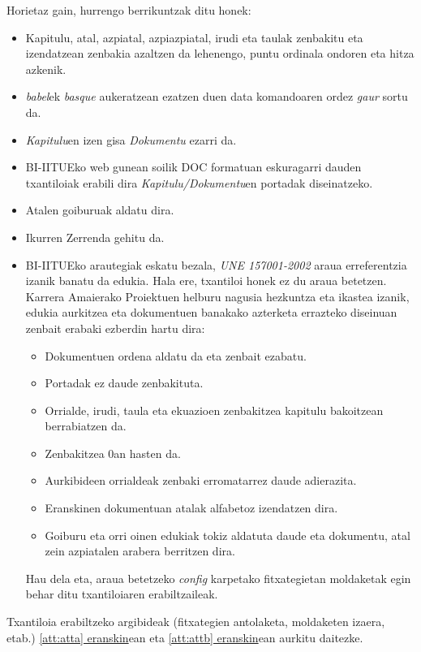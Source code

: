 Horietaz gain, hurrengo berrikuntzak ditu honek:

\begin{itemize}
\item{Kapitulu, atal, azpiatal, azpiazpiatal, irudi eta taulak zenbakitu eta izendatzean zenbakia azaltzen da lehenengo, puntu ordinala ondoren eta hitza azkenik.}
\item{\emph{babel}ek \emph{basque} aukeratzean ezatzen duen data komandoaren ordez \emph{gaur} sortu da.}
\item{\emph{Kapitulu}en izen gisa \emph{Dokumentu} ezarri da.}
\item{BI-IITUEko web gunean soilik DOC formatuan eskuragarri dauden txantiloiak erabili dira \emph{Kapitulu/Dokumentu}en portadak diseinatzeko.}
\item{Atalen goiburuak aldatu dira.}
\item{Ikurren Zerrenda gehitu da.}
\item{BI-IITUEko arautegiak eskatu bezala, \emph{UNE 157001-2002} araua erreferentzia izanik banatu da edukia. Hala ere, txantiloi honek ez du araua betetzen. Karrera Amaierako Proiektuen helburu nagusia hezkuntza eta ikastea izanik, edukia aurkitzea eta dokumentuen banakako azterketa errazteko diseinuan zenbait erabaki ezberdin hartu dira:
 \begin{itemize}
  \item{Dokumentuen ordena aldatu da eta zenbait ezabatu.}
  \item{Portadak ez daude zenbakituta.}
  \item{Orrialde, irudi, taula eta ekuazioen zenbakitzea kapitulu bakoitzean berrabiatzen da.} 
  \item{Zenbakitzea 0an hasten da.}
  \item{Aurkibideen orrialdeak zenbaki erromatarrez daude adierazita.}
  \item{Eranskinen dokumentuan atalak alfabetoz izendatzen dira.}
  \item{Goiburu eta orri oinen edukiak tokiz aldatuta daude eta dokumentu, atal zein azpiatalen arabera berritzen dira.}
 \end{itemize}
Hau dela eta, araua betetzeko \emph{config} karpetako fitxategietan moldaketak egin behar ditu txantiloiaren erabiltzaileak.
}
\end{itemize}

Txantiloia erabiltzeko argibideak (fitxategien antolaketa, moldaketen izaera, etab.) \hyperref[att:atta]{\ref*{att:atta} eranskin}ean eta \hyperref[att:attb]{\ref*{att:attb} eranskin}ean aurkitu daitezke.

